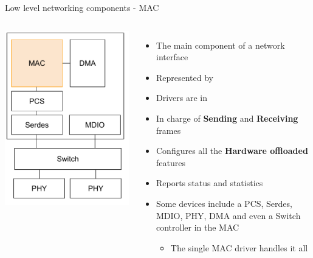 \begin{frame}{Low level networking components - MAC}
	\begin{columns}
			\includegraphics[width=\textwidth]{slides/networking-driver-overview/net_components_mac.pdf}
		\begin{itemize}
			\item The main component of a network interface
			\item Represented by 
			\item Drivers are in 
			\item In charge of \textbf{Sending} and \textbf{Receiving} frames
			\item Configures all the \textbf{Hardware offloaded} features
			\item Reports status and statistics
			\item Some devices include a PCS, Serdes, MDIO, PHY, DMA and even a Switch controller in the MAC
				\begin{itemize}
					\item The single MAC driver handles it all
				\end{itemize}
		\end{itemize}
	\end{columns}
\end{frame}

